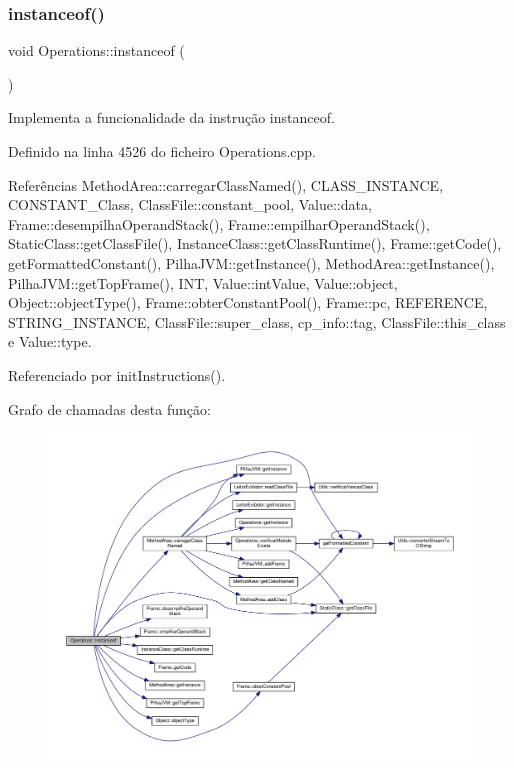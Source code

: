\subsubsection{\texorpdfstring{instanceof()}{instanceof()}}
{\footnotesize\ttfamily void Operations\+::instanceof (\begin{DoxyParamCaption}{ }\end{DoxyParamCaption})\hspace{0.3cm}{\ttfamily [private]}}



Implementa a funcionalidade da instrução instanceof. 



Definido na linha 4526 do ficheiro Operations.\+cpp.



Referências Method\+Area\+::carregar\+Class\+Named(), C\+L\+A\+S\+S\+\_\+\+I\+N\+S\+T\+A\+N\+CE, C\+O\+N\+S\+T\+A\+N\+T\+\_\+\+Class, Class\+File\+::constant\+\_\+pool, Value\+::data, Frame\+::desempilha\+Operand\+Stack(), Frame\+::empilhar\+Operand\+Stack(), Static\+Class\+::get\+Class\+File(), Instance\+Class\+::get\+Class\+Runtime(), Frame\+::get\+Code(), get\+Formatted\+Constant(), Pilha\+J\+V\+M\+::get\+Instance(), Method\+Area\+::get\+Instance(), Pilha\+J\+V\+M\+::get\+Top\+Frame(), I\+NT, Value\+::int\+Value, Value\+::object, Object\+::object\+Type(), Frame\+::obter\+Constant\+Pool(), Frame\+::pc, R\+E\+F\+E\+R\+E\+N\+CE, S\+T\+R\+I\+N\+G\+\_\+\+I\+N\+S\+T\+A\+N\+CE, Class\+File\+::super\+\_\+class, cp\+\_\+info\+::tag, Class\+File\+::this\+\_\+class e Value\+::type.



Referenciado por init\+Instructions().

Grafo de chamadas desta função\+:
\nopagebreak
\begin{figure}[H]
\begin{center}
\leavevmode
\includegraphics[width=350pt]{classOperations_a22e16734b441e5cf7e6bdfb09fb152fa_cgraph}
\end{center}
\end{figure}
\mbox{\label{classOperations_a9206595fad5d3ac24514b2dfd6a013da}} 
